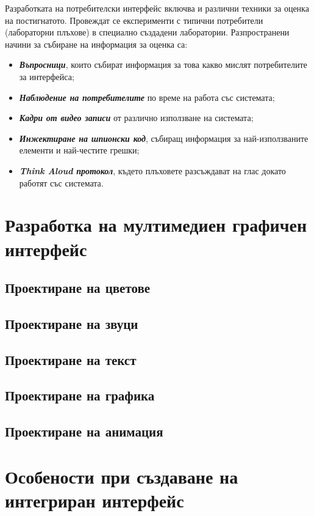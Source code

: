 \documentclass[fleqn,12pt]{article}
\begin{document}
Разработката на потребителски интерфейс включва и различни техники за оценка на постигнатото.
Провеждат се експерименти с типични потребители (лабораторни плъхове) в специално създадени лаборатории.
\bigbreak
Разпространени начини за събиране на информация за оценка са:
\begin{itemize}
    \item \textbf{\textit{Въпросници}}, които събират информация за това какво мислят потребителите за интерфейса;
    \item \textbf{\textit{Наблюдение на потребителите}} по време на работа със системата;
    \item \textbf{\textit{Кадри от видео записи}} от различно използване на системата;
    \item \textbf{\textit{Инжектиране на шпионски код}}, събиращ информация за най-използваните елементи и най-честите грешки;
    \item \textbf{\textit{Think Aloud протокол}}, където плъховете разсъждават на глас докато работят със системата.
\end{itemize}

\section{Разработка на мултимедиен графичен интерфейс}

\subsection{Проектиране на цветове}
\subsection{Проектиране на звуци}
\subsection{Проектиране на текст}
\subsection{Проектиране на графика}
\subsection{Проектиране на анимация}

\section{Особености при създаване на интегриран интерфейс}
\end{document}
